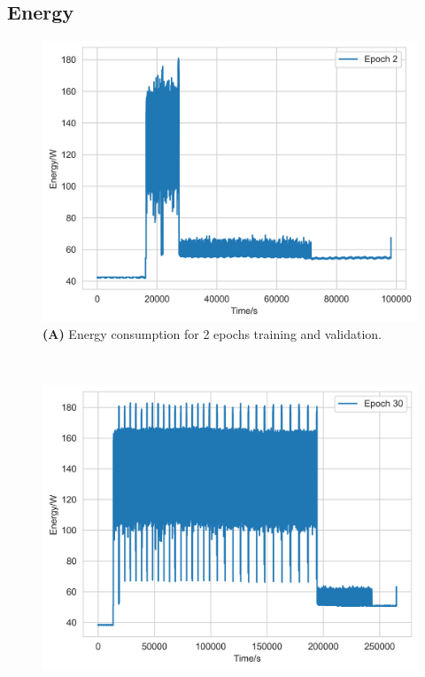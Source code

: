 \documentclass[utf8]{FrontiersinVancouver} %
\begin{document}
\subsection{Energy}
\label{sec:perf-energy}

\begin{figure}[htb]

  \begin{center}
     \begin{minipage}[t]{0.30\textwidth}
        \includegraphics[width=1.0\linewidth]{images/card-name-v100-gpu-count-1-cpu-num-6-mem-32gb-repeat-1-tfttransformerepochs-2.png}
        {\bf (A)} Energy consumption for 2 epochs training and validation.
     \end{minipage}
     \ \
     \begin{minipage}[t]{0.30\textwidth}
        \includegraphics[width=1.0\linewidth]{images/card-name-v100-gpu-count-1-cpu-num-6-mem-32gb-repeat-1-tfttransformerepochs-30.png}

\end{minipage}
\end{center}
\end{figure}
\end{document}
